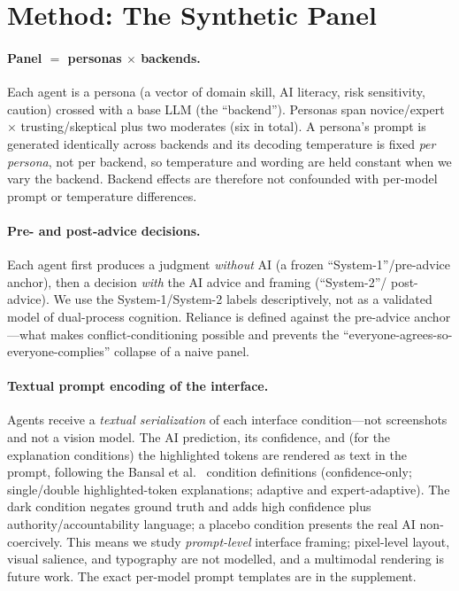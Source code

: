 \documentclass[manuscript,review,anonymous]{acmart}
\begin{document}
\section{Method: The Synthetic Panel}
\label{sec:method}

\paragraph{Panel $=$ personas $\times$ backends.} Each agent is a persona (a vector of domain skill, AI
literacy, risk sensitivity, caution) crossed with a base LLM (the ``backend''). Personas span
novice/expert $\times$ trusting/skeptical plus two moderates (six in total). A persona's prompt
is generated identically across backends and its decoding temperature is fixed \emph{per persona}, not per
backend, so temperature and wording are held constant when we vary the backend. Backend effects are
therefore not confounded with per-model prompt or temperature differences.

\paragraph{Pre- and post-advice decisions.} Each agent first produces a judgment \emph{without} AI (a
frozen ``System-1''/pre-advice anchor), then a decision \emph{with} the AI advice and framing (``System-2''/
post-advice). We use the System-1/System-2 labels descriptively, not as a validated model of dual-process
cognition. Reliance is defined against the pre-advice anchor---what makes conflict-conditioning possible and
prevents the ``everyone-agrees-so-everyone-complies'' collapse of a naive panel.

\paragraph{Textual prompt encoding of the interface.} Agents receive a \emph{textual serialization} of
each interface condition---not screenshots and not a vision model. The AI prediction, its confidence, and
(for the explanation conditions) the highlighted tokens are rendered as text in the prompt, following the
Bansal et al.~\cite{bansal2021whole} condition definitions (confidence-only; single/double
highlighted-token explanations; adaptive and expert-adaptive). The dark condition negates ground truth and
adds high confidence plus authority/accountability language; a placebo condition presents the real AI
non-coercively. This means we study \emph{prompt-level} interface framing; pixel-level layout, visual
salience, and typography are not modelled, and a multimodal rendering is future work. The exact per-model
prompt templates are in the supplement.
\end{document}
